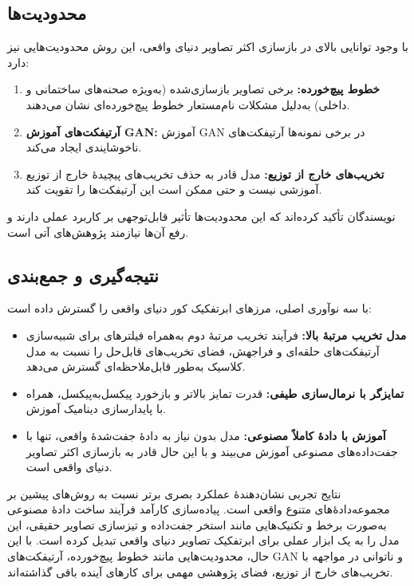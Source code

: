 \subsection{محدودیت‌ها}
\label{subsec:limitations}

با وجود توانایی بالای  در بازسازی اکثر تصاویر دنیای واقعی، این روش محدودیت‌هایی نیز دارد:
\begin{enumerate}
	\item \textbf{خطوط پیچ‌خورده:} برخی تصاویر بازسازی‌شده (به‌ویژه صحنه‌های ساختمانی و داخلی) به‌دلیل مشکلات نام‌مستعار خطوط پیچ‌خورده‌ای نشان می‌دهند.
	\item \textbf{آرتیفکت‌های آموزش GAN:} آموزش GAN در برخی نمونه‌ها آرتیفکت‌های ناخوشایندی ایجاد می‌کند.
	\item \textbf{تخریب‌های خارج از توزیع:} مدل قادر به حذف تخریب‌های پیچیدهٔ خارج از توزیع آموزشی نیست و حتی ممکن است این آرتیفکت‌ها را تقویت کند.
\end{enumerate}
نویسندگان تأکید کرده‌اند که این محدودیت‌ها تأثیر قابل‌توجهی بر کاربرد عملی  دارند و رفع آن‌ها نیازمند پژوهش‌های آتی است.


\subsection{نتیجه‌گیری و جمع‌بندی}
\label{subsec:realesrgan_summary}

 با سه نوآوری اصلی، مرزهای ابرتفکیک کور دنیای واقعی را گسترش داده است:
\begin{itemize}
	\item \textbf{مدل تخریب مرتبهٔ بالا:} فرآیند تخریب مرتبهٔ دوم به‌همراه فیلترهای  برای شبیه‌سازی آرتیفکت‌های حلقه‌ای و فراجهش، فضای تخریب‌های قابل‌حل را نسبت به مدل کلاسیک به‌طور قابل‌ملاحظه‌ای گسترش می‌دهد.
	\item \textbf{تمایزگر  با نرمال‌سازی طیفی:} قدرت تمایز بالاتر و بازخورد پیکسل‌به‌پیکسل، همراه با پایدارسازی دینامیک آموزش.
	\item \textbf{آموزش با دادهٔ کاملاً مصنوعی:} مدل بدون نیاز به دادهٔ جفت‌شدهٔ واقعی، تنها با جفت‌داده‌های مصنوعی آموزش می‌بیند و با این حال قادر به بازسازی اکثر تصاویر دنیای واقعی است.
\end{itemize}

نتایج تجربی نشان‌دهندهٔ عملکرد بصری برتر  نسبت به روش‌های پیشین بر مجموعه‌دادهٔ‌های متنوع واقعی است. پیاده‌سازی کارآمد فرآیند ساخت دادهٔ مصنوعی به‌صورت برخط و تکنیک‌هایی مانند استخر جفت‌داده و تیزسازی تصاویر حقیقی، این مدل را به یک ابزار عملی برای ابرتفکیک تصاویر دنیای واقعی تبدیل کرده است. با این حال، محدودیت‌هایی مانند خطوط پیچ‌خورده، آرتیفکت‌های GAN و ناتوانی در مواجهه با تخریب‌های خارج از توزیع، فضای پژوهشی مهمی برای کارهای آینده باقی گذاشته‌اند.

